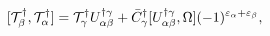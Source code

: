 \begin{equation}\label{5.15}
[{\cal T}^\dagger_\beta,{\cal T}^\dagger_\alpha]=
{\cal T}^\dagger_\gamma U^{\dagger\gamma}_{\alpha\beta}+
\bar{C}^\dagger_\gamma[U^{\dagger\gamma}_{\alpha\beta},\Omega]
(-1)^{\varepsilon_\alpha+\varepsilon_\beta},
\end{equation}

